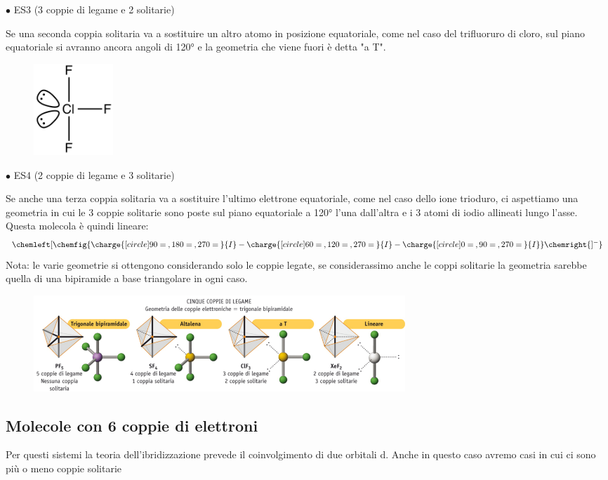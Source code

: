 $\bullet$ ES3  (3 coppie di legame e 2 solitarie)

Se una seconda coppia solitaria va a sostituire un altro atomo in posizione equatoriale, come nel caso del trifluoruro di cloro, sul piano equatoriale si avranno ancora angoli di 120° e la geometria che viene fuori è detta "a T".
\begin{figure}[htp]
    \centering
    \includegraphics[width=3cm]{immagini/ClF_3.png}
\end{figure}

$\bullet$ ES4  (2 coppie di legame e 3 solitarie)

Se anche una terza coppia solitaria va a sostituire l'ultimo elettrone equatoriale, come nel caso dello ione trioduro, ci aspettiamo una geometria in cui le 3 coppie solitarie sono poste sul piano equatoriale a 120° l'una dall'altra e i 3 atomi di iodio allineati lungo l'asse. Questa molecola è quindi lineare:
$$
\chemleft[ \chemfig{\charge{[circle]90=\:,180=\:,270=\:}{I}-\charge{[circle]60=\:,120=\:,270=\:}{I}-\charge{[circle]0=\:,90=\:,270=\:}{I}} \chemright{]^{-}}
$$
Nota: le varie geometrie si ottengono considerando solo le coppie legate, se considerassimo anche le coppi solitarie la geometria sarebbe quella di una bipiramide a base triangolare in ogni caso.
\begin{figure}[htp]
    \centering
    \includegraphics[width=14cm]{immagini/geometrie-5-coppie.png}
\end{figure}
\subsection{Molecole con 6 coppie di elettroni}
Per questi sistemi la teoria dell'ibridizzazione prevede il coinvolgimento di due orbitali d. Anche in questo caso avremo casi in cui ci sono più o meno coppie solitarie

